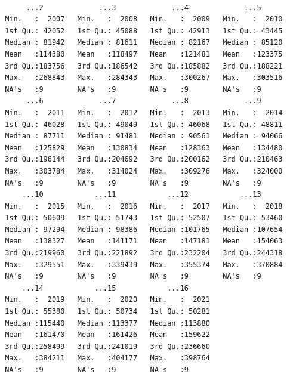 \documentclass[
  letterpaper,
  DIV=11,
  numbers=noendperiod]{scrreprt}
\begin{document}
\begin{verbatim}
                                                                                                                                              
      ...2             ...3             ...4             ...5       
 Min.   :  2007   Min.   :  2008   Min.   :  2009   Min.   :  2010  
 1st Qu.: 42052   1st Qu.: 45088   1st Qu.: 42913   1st Qu.: 43445  
 Median : 81942   Median : 81611   Median : 82167   Median : 85120  
 Mean   :114380   Mean   :118497   Mean   :121481   Mean   :123375  
 3rd Qu.:183756   3rd Qu.:186542   3rd Qu.:185882   3rd Qu.:188221  
 Max.   :268843   Max.   :284343   Max.   :300267   Max.   :303516  
 NA's   :9        NA's   :9        NA's   :9        NA's   :9       
      ...6             ...7             ...8             ...9       
 Min.   :  2011   Min.   :  2012   Min.   :  2013   Min.   :  2014  
 1st Qu.: 46028   1st Qu.: 49049   1st Qu.: 46068   1st Qu.: 48811  
 Median : 87711   Median : 91481   Median : 90561   Median : 94066  
 Mean   :125829   Mean   :130834   Mean   :128363   Mean   :134480  
 3rd Qu.:196144   3rd Qu.:204692   3rd Qu.:200162   3rd Qu.:210463  
 Max.   :303784   Max.   :314024   Max.   :309276   Max.   :324000  
 NA's   :9        NA's   :9        NA's   :9        NA's   :9       
     ...10            ...11            ...12            ...13       
 Min.   :  2015   Min.   :  2016   Min.   :  2017   Min.   :  2018  
 1st Qu.: 50609   1st Qu.: 51743   1st Qu.: 52507   1st Qu.: 53460  
 Median : 97294   Median : 98386   Median :101765   Median :107654  
 Mean   :138327   Mean   :141171   Mean   :147181   Mean   :154063  
 3rd Qu.:219960   3rd Qu.:221892   3rd Qu.:232204   3rd Qu.:244318  
 Max.   :329551   Max.   :339439   Max.   :355374   Max.   :370884  
 NA's   :9        NA's   :9        NA's   :9        NA's   :9       
     ...14            ...15            ...16       
 Min.   :  2019   Min.   :  2020   Min.   :  2021  
 1st Qu.: 55380   1st Qu.: 50734   1st Qu.: 50281  
 Median :115440   Median :113377   Median :113880  
 Mean   :161470   Mean   :161426   Mean   :159622  
 3rd Qu.:258499   3rd Qu.:241019   3rd Qu.:236660  
 Max.   :384211   Max.   :404177   Max.   :398764  
 NA's   :9        NA's   :9        NA's   :9       
\end{verbatim}
\end{document}
